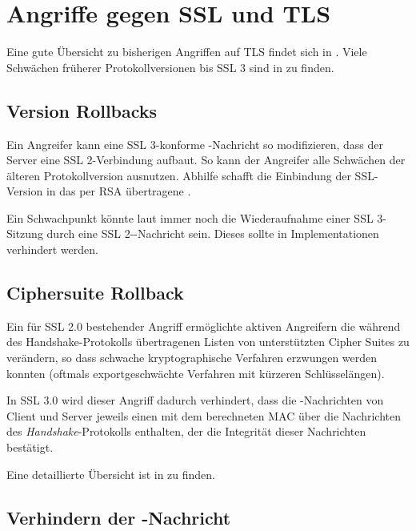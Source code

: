 
\chapter{Angriffe gegen SSL und TLS}

Eine gute Übersicht zu bisherigen Angriffen auf TLS findet sich in \cite{meyer13}. Viele Schwächen früherer Protokollversionen bis SSL 3 sind in \cite{wagner96} zu finden.

\section{Version Rollbacks}

Ein Angreifer kann eine SSL 3-konforme \clienthello{}-Nachricht so modifizieren, dass der Server eine SSL 2-Verbindung aufbaut. So kann der Angreifer alle Schwächen der älteren Protokollversion ausnutzen. Abhilfe schafft die Einbindung der SSL-Version in das per RSA übertragene \premastersecret. 

Ein Schwachpunkt könnte laut \cite{wagner96} immer noch die Wiederaufnahme einer SSL 3-Sitzung durch eine SSL 2-\clienthello{}-Nachricht sein. Dieses sollte in Implementationen verhindert werden.

\section{Ciphersuite Rollback}

Ein für SSL 2.0 bestehender Angriff ermöglichte aktiven Angreifern die während des Handshake-Protokolls übertragenen Listen von unterstützten Cipher Suites zu verändern, so dass schwache kryptographische Verfahren erzwungen werden konnten (oftmals exportgeschwächte Verfahren mit kürzeren Schlüsselängen).

In SSL 3.0 wird dieser Angriff dadurch verhindert, dass die \finished{}-Nachrichten von Client und Server jeweils einen mit dem \mastersecret{} berechneten MAC über die Nachrichten des \emph{Handshake}-Protokolls enthalten, der die Integrität dieser Nachrichten bestätigt.

Eine detaillierte Übersicht ist in \cite{wagner96} zu finden.

\section{Verhindern der \changecipherspec{}-Nachricht}

